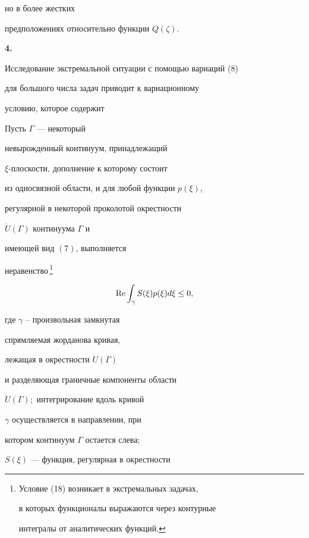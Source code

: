 но в более жестких 


предположениях относительно функции $Q(\zeta)$.


\medskip





{\bf 4.}


Исследование экстремальной ситуации с помощью вариаций (8)


для большого числа задач приводит к вариационному


условию, которое содержит








\begin{lem}


Пусть $\Gamma$ --- некоторый 


невырожденный континуум, принадлежащий 


$\xi$-плос\-ко\-сти, дополнение к которому состоит


из односвязной области, и для любой функции $p(\xi)$,


регулярной в некоторой проколотой окрестности


$\Dot{U}(\Gamma)$ континуума $\Gamma$ и 


имеющей вид $(7)$, выполняется


неравенство\,\footnote{Условие (18) возникает в экстремальных задачах, 


в которых функционалы выражаются через контурные 


интегралы от аналитических функций.}


\begin{equation}


\re\int_{\gamma}S(\xi)p(\xi)d\xi\le 0,


\end{equation}


где $\gamma$ -- произвольная замкнутая 


спрямляемая жорданова кривая,


лежащая в окрестности $\Dot{U}(\Gamma)$


и разделяющая граничные компоненты области


$\Dot{U}(\Gamma);$ интегрирование вдоль кривой


$\gamma$ осуществляется в направлении, при 


котором континуум $\Gamma$ остается слева$;$


$S(\xi)$ --- функция, регулярная в окрестности 



\end{lem}
